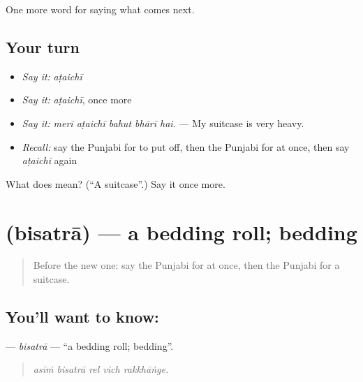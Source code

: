\begin{grammarlens}[title={What you've built}]
One more word for saying what comes next.
\end{grammarlens}

\subsection*{Your turn}
\begin{itemize}
\raggedright
  \item \emph{Say it:} \emph{aṭaichī}
  \item \emph{Say it:} \emph{aṭaichī}, once more
  \item \emph{Say it:} \emph{merī aṭaichī bahut bhārī hai.} — My suitcase is very heavy.
  \item \emph{Recall:} say the Punjabi for to put off, then the Punjabi for at once, then say \emph{aṭaichī} again
\end{itemize}

\begin{tcolorbox}[breakable,colback=teal!4,colframe=teal!35!black,title={Before you move on}]
What does  mean? (\textquotedblleft{}A suitcase\textquotedblright{}.) Say it once more.
\end{tcolorbox}
\section[\texorpdfstring{\pa{ਬਿਸਤਰਾ} (bisatrā)}{ਬਿਸਤਰਾ (bisatrā)}]{ (bisatrā) — a bedding roll; bedding}

\label{lesson:PA-C282-bisatra}



\begin{quote}
Before the new one: say the Punjabi for at once, then the Punjabi for a suitcase.
\end{quote}

\subsection*{You'll want to know: }
\textbf{} — \emph{bisatrā} — \textquotedblleft{}a bedding roll; bedding\textquotedblright{}.

\begin{quote}
    
\end{quote}

\begin{quote}
\emph{asīṁ bisatrā rel vich rakkhāṅge.}
\end{quote}

